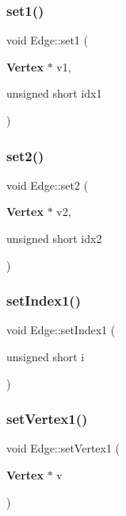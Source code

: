 \mbox{\label{classEdge_a058438cf83e35b0ea6322ff8e5e3eefb}} 
\subsubsection{set1()}
{\footnotesize\ttfamily void Edge\+::set1 (\begin{DoxyParamCaption}\item[{\textbf{ Vertex} $\ast$}]{v1,  }\item[{unsigned short}]{idx1 }\end{DoxyParamCaption})}

\mbox{\label{classEdge_a08854a9139fead445d8a6ddb34dfa172}} 
\subsubsection{set2()}
{\footnotesize\ttfamily void Edge\+::set2 (\begin{DoxyParamCaption}\item[{\textbf{ Vertex} $\ast$}]{v2,  }\item[{unsigned short}]{idx2 }\end{DoxyParamCaption})}

\mbox{\label{classEdge_a50d59e065b66696d25ae54427a40ea1e}} 
\subsubsection{set\+Index1()}
{\footnotesize\ttfamily void Edge\+::set\+Index1 (\begin{DoxyParamCaption}\item[{unsigned short}]{i }\end{DoxyParamCaption})\hspace{0.3cm}{\ttfamily [inline]}}

\mbox{\label{classEdge_a92c7a9a5a34934d0a9618a64db6ff0d3}} 
\subsubsection{set\+Vertex1()}
{\footnotesize\ttfamily void Edge\+::set\+Vertex1 (\begin{DoxyParamCaption}\item[{\textbf{ Vertex} $\ast$}]{v }\end{DoxyParamCaption})\hspace{0.3cm}{\ttfamily [inline]}}

